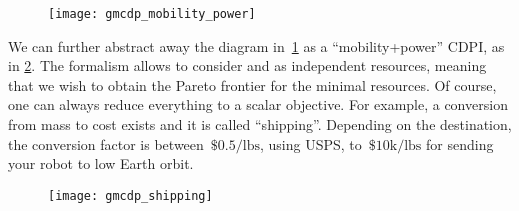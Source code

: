 \begin{example}
    \begin{figure}[h]
        \begin{centering}
            \texttt{[image: gmcdp\_mobility\_power]}
        \end{centering}
        \caption{\label{fig:another}}
    \end{figure}

    We can further abstract away the diagram in~\cref{fig:another} as
    a ``mobility+power'' CDPI, as in \cref{fig:shipping}. The formalism
    allows to consider  and  as independent resources,
    meaning that we wish to obtain the Pareto frontier for the minimal
    resources. Of course, one can always reduce everything to a scalar
    objective. For example, a conversion from mass to cost exists and
    it is called ``shipping''. Depending on the destination, the conversion
    factor is between~$\$0.5/\mbox{lbs}$, using USPS, to~$\$10\mbox{k}/\mbox{lbs}$
    for sending your robot to low Earth orbit.


    \begin{figure}[h]
        \centering{}\texttt{[image: gmcdp\_shipping]}\caption{\label{fig:shipping}}
    \end{figure}

\end{example}

